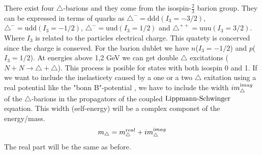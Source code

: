 There exist four $\triangle$-barions
and they come from the isospin-$\frac{2}{3}$ barion group.
They can be expressed in terms of quarks as $\triangle^-={\textrm{ddd}}(I_3=-3/2)$,\;$\triangle^-=\textrm{udd}(I_3=-1/2)$,
\;$\triangle^-={\textrm{uud}}(I_3=1/2)$ and $\triangle^{++}={\textrm{uuu}}(I_3=3/2)$. Where $I_3$ is related to the particles
electrical charge. This quatety is concerved since the charge is conseved.
For the barion dublet we have $n$($I_3=-1/2$) and $p$($I_3=1/2$).
%
%
At energies above 1,2 GeV we can get double $\triangle$ excitations ($N+N\to \triangle+\triangle$).
This process is posible for states with both isospin 0 and 1.
If we want to include the inelasticety caused by a one or a two 
$\triangle$ exitation using a real potential like the "bonn B"-potential
, we have to include the width $im^{{\text imag}}_\triangle$ 
of the $\triangle$-barions in the propagators of the coupled $\text{Lippmann-Schwinger}$ equation.
This width (self-energy) will be a complex componet
of the energy/mass. 
\begin{equation}
m_\triangle=m^{{\text real}}_\triangle+im^{{\text imag}}_\triangle
\end{equation}
The real part will be the same as before. 







